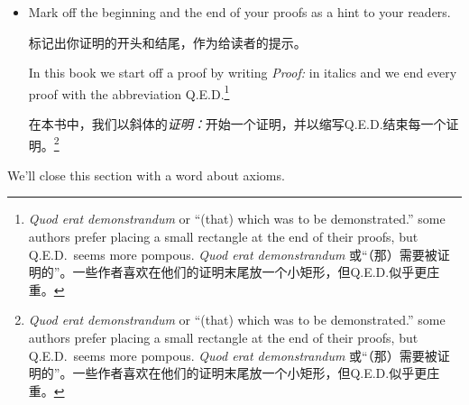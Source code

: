 \begin{itemize}
当你意指“因为”时，不要说“如果”。真的！

If you start a
proof about rational numbers like so:

如果你像这样开始一个关于有理数的证明：

\begin{quote}
{\em Proof:} Suppose that $x$ is a particular but arbitrary rational number.

{\em 证明：}假设 $x$ 是一个特定但任意的有理数。

If $x$ is a rational number, it follows that \ldots

如果 $x$ 是一个有理数，那么……
\end{quote}

\noindent people are going to look at you funny.

\noindent 人们会用奇怪的眼神看你。

What's the point of 
{\em supposing}
that $x$ is rational, then acting as if you're in doubt of that fact by
writing ``if''?

{\em 假设} $x$ 是有理数，然后又通过写“如果”来表现出你对这个事实的怀疑，这有什么意义呢？

You mean ``since.''

你的意思是“因为”。
\item Mark off the beginning and the end of your proofs as a hint to your
readers.

标记出你证明的开头和结尾，作为给读者的提示。

In this book we start off a proof by writing {\em Proof:} in 
italics and we end every proof with the abbreviation 
Q.E.D.\footnote{{\em Quod erat demonstrandum} or ``(that) which was to 
be demonstrated.'' some authors prefer placing a small rectangle at 
the end of their proofs, but Q.E.D.\ seems more pompous. {\em Quod erat demonstrandum} 或“（那）需要被证明的”。一些作者喜欢在他们的证明末尾放一个小矩形，但Q.E.D.似乎更庄重。}

在本书中，我们以斜体的{\em 证明：}开始一个证明，并以缩写Q.E.D.结束每一个证明。\footnote{{\em Quod erat demonstrandum} or ``(that) which was to 
be demonstrated.'' some authors prefer placing a small rectangle at 
the end of their proofs, but Q.E.D.\ seems more pompous. {\em Quod erat demonstrandum} 或“（那）需要被证明的”。一些作者喜欢在他们的证明末尾放一个小矩形，但Q.E.D.似乎更庄重。}
\end{itemize}

\newpage

We'll close this section with a word about axioms.

